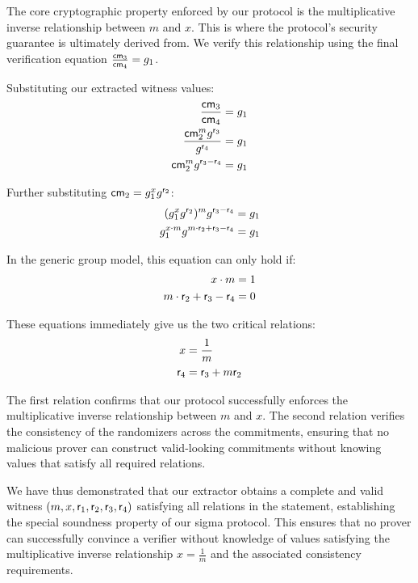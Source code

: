\begin{enumerate}
    The core cryptographic property enforced by our protocol is the multiplicative inverse relationship between $m$ and $x$. This is where the protocol's security guarantee is ultimately derived from. We verify this relationship using the final verification equation $\frac{\mathsf{cm}_3}{\mathsf{cm}_4} = g_1$.
    
    Substituting our extracted witness values:
    \begin{align}
        \frac{\mathsf{cm}_3}{\mathsf{cm}_4} &= g_1 \\
        \frac{\mathsf{cm}_2^m g^{\mathsf{r}_3}}{g^{\mathsf{r}_4}} &= g_1 \\
        \mathsf{cm}_2^m g^{\mathsf{r}_3 - \mathsf{r}_4} &= g_1
    \end{align}
    
    Further substituting $\mathsf{cm}_2 = g_1^x g^{\mathsf{r}_2}$:
    \begin{align}
        (g_1^x g^{\mathsf{r}_2})^m g^{\mathsf{r}_3 - \mathsf{r}_4} &= g_1 \\
        g_1^{x \cdot m} g^{m \cdot \mathsf{r}_2 + \mathsf{r}_3 - \mathsf{r}_4} &= g_1
    \end{align}
    
    In the generic group model, this equation can only hold if:
    \begin{align}
        x \cdot m &= 1 \\
        m \cdot \mathsf{r}_2 + \mathsf{r}_3 - \mathsf{r}_4 &= 0
    \end{align}
    
    These equations immediately give us the two critical relations:
    \begin{align}
        x &= \frac{1}{m} \\
        \mathsf{r}_4 &= \mathsf{r}_3 + m\mathsf{r}_2
    \end{align}
    
    The first relation confirms that our protocol successfully enforces the multiplicative inverse relationship between $m$ and $x$. The second relation verifies the consistency of the randomizers across the commitments, ensuring that no malicious prover can construct valid-looking commitments without knowing values that satisfy all required relations.
\end{enumerate}

We have thus demonstrated that our extractor obtains a complete and valid witness $(m, x, \mathsf{r}_1, \mathsf{r}_2, \mathsf{r}_3, \mathsf{r}_4)$ satisfying all relations in the statement, establishing the special soundness property of our sigma protocol. This ensures that no prover can successfully convince a verifier without knowledge of values satisfying the multiplicative inverse relationship $x = \frac{1}{m}$ and the associated consistency requirements.

